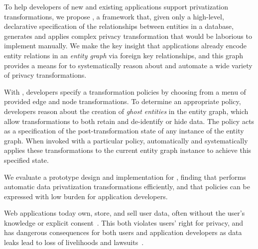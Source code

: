 To help developers of new and existing applications support privatization transformations, we
propose \sys, a framework that, given only a high-level, declarative specification of the
relationships between entities in a database, generates and applies complex privacy transformation
that would be laborious to implement manually. We make the key insight that applications already encode
entity relations in an \emph{entity graph} via foreign key relationships, and this graph provides a
means for \sys to systematically reason about and automate a wide variety of privacy transformations.

With \sys, developers specify a transformation policies by choosing from a menu of provided edge and
node transformations. To determine an appropriate policy, developers reason about the creation of
\emph{ghost entities} in the entity graph, which allow transformations to both retain and
de-identify or hide data. The policy acts as a specification of the post-transformation state of any
instance of the entity graph. When invoked with a particular policy, \sys automatically and
systematically applies these transformations to the current entity graph instance to achieve this
specified state.

We evaluate a prototype design and implementation for \sys, finding that \sys performs automatic
data privatization transformations efficiently, and that policies can be expressed with low burden for
application developers.

\iffalse
%
%
Web applications today own, store, and sell user data, often without the user's knowledge or
explicit consent~\cite{nytimes:fb, npr:data}. This both violates users' right for privacy, and has
dangerous consequences for both users and application developers as data leaks lead to loss of
livelihoods and lawsuits~\cite{breach:amazon,breach:twitter, breach:fb, breach:marriott,
breach:quora}. 

